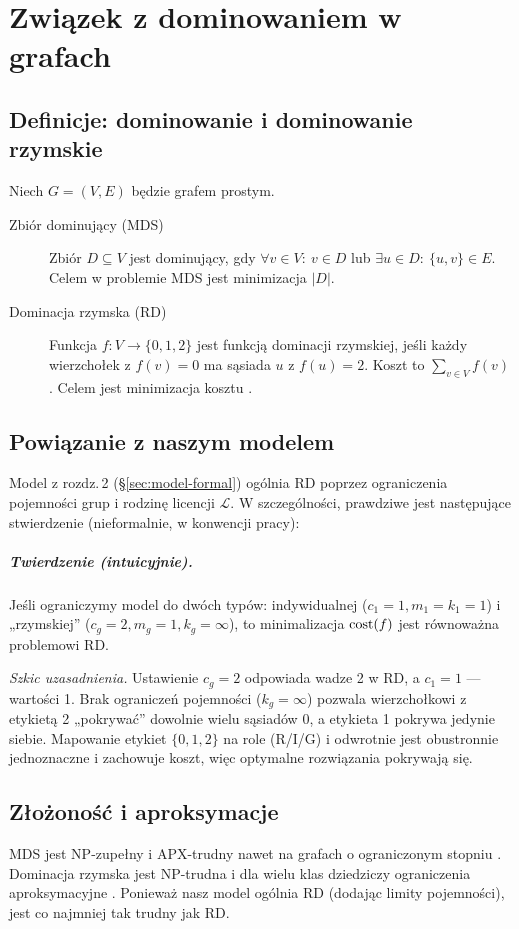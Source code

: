 \chapter{Związek z dominowaniem w grafach}

\section{Definicje: dominowanie i dominowanie rzymskie}
\noindent Niech $G=(V,E)$ będzie grafem prostym.
\begin{description}
  \item[Zbiór dominujący (MDS)] Zbiór $D\subseteq V$ jest dominujący, gdy $\forall v\in V:\ v\in D$ lub $\exists u\in D:\ \{u,v\}\in E$. Celem w problemie MDS jest minimizacja $|D|$.
  \item[Dominacja rzymska (RD)] Funkcja $f:V\to\{0,1,2\}$ jest funkcją dominacji rzymskiej, jeśli każdy wierzchołek z $f(v)=0$ ma sąsiada $u$ z $f(u)=2$. Koszt to $\sum_{v\in V} f(v)$. Celem jest minimizacja kosztu \cite{Cockayne2004,henning2013roman}.
\end{description}

\section{Powiązanie z naszym modelem}
\noindent Model z rozdz.\,2 (\S\ref{sec:model-formal}) ogólnia RD poprzez ograniczenia pojemności grup i rodzinę licencji $\mathcal{L}$. W szczególności, prawdziwe jest następujące stwierdzenie (nieformalnie, w konwencji pracy):

\paragraph{Twierdzenie (intuicyjnie).} Jeśli ograniczymy model do dwóch typów: indywidualnej ($c_1=1, m_1=k_1=1$) i „rzymskiej” ($c_g=2, m_g=1, k_g=\infty$), to minimalizacja $\operatorname{cost}(f)$ jest równoważna problemowi RD.

\textit{Szkic uzasadnienia.} Ustawienie $c_g=2$ odpowiada wadze 2 w RD, a $c_1=1$ — wartości 1. Brak ograniczeń pojemności ($k_g=\infty$) pozwala wierzchołkowi z etykietą 2 „pokrywać” dowolnie wielu sąsiadów 0, a etykieta 1 pokrywa jedynie siebie. Mapowanie etykiet $\{0,1,2\}$ na role (R/I/G) i odwrotnie jest obustronnie jednoznaczne i zachowuje koszt, więc optymalne rozwiązania pokrywają się.

\section{Złożoność i aproksymacje}
\noindent MDS jest NP-zupełny i APX-trudny nawet na grafach o ograniczonym stopniu \cite{ALIMONTI2000123,chlebik2008}. Dominacja rzymska jest NP-trudna \cite{chambers2009} i dla wielu klas dziedziczy ograniczenia aproksymacyjne \cite{POUREIDI2023106363}. Ponieważ nasz model ogólnia RD (dodając limity pojemności), jest co najmniej tak trudny jak RD.

